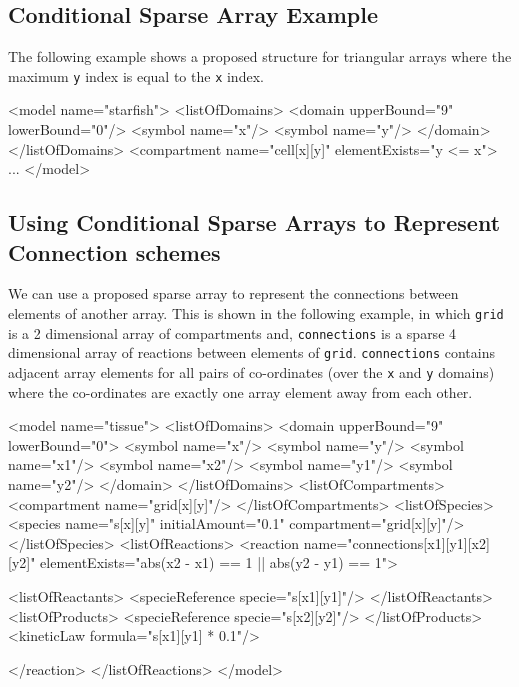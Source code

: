 \documentclass{cekarticle}
\begin{document}
\subsection{Conditional Sparse Array Example}
\label{sec:sparseeg}

The following example shows a proposed structure for triangular
arrays where the maximum \texttt{y} index is equal to the
\texttt{x} index.

\begin{example}
<model name="starfish">
    <listOfDomains>
        <domain upperBound="9" lowerBound="0"/>
            <symbol name="x"/>
            <symbol name="y"/>
        </domain>
    </listOfDomains>
    <compartment name="cell[x][y]" elementExists="y <= x">
    ...
</model>
\end{example}

\subsection{Using Conditional Sparse Arrays to Represent Connection schemes}
\label{sec:connections}

We can use a proposed sparse array to represent the connections
between elements of another array.  This is shown in the
following example, in which \texttt{grid} is a 2 dimensional
array of compartments and, \texttt{connections} is a sparse 4
dimensional array of reactions between elements of \texttt{grid}.
\texttt{connections} contains adjacent array elements for all
pairs of co-ordinates (over the \texttt{x} and \texttt{y}
domains) where the co-ordinates are exactly one array element
away from each other.

\begin{example}
<model name="tissue">
    <listOfDomains>
        <domain upperBound="9" lowerBound="0">
            <symbol name="x"/>
            <symbol name="y"/>
            <symbol name="x1"/>
            <symbol name="x2"/>
            <symbol name="y1"/>
            <symbol name="y2"/>
        </domain>
    </listOfDomains>
    <listOfCompartments>
        <compartment name="grid[x][y]"/>
    </listOfCompartments>
    <listOfSpecies>
        <species name="s[x][y]" initialAmount="0.1" compartment="grid[x][y]"/>
    </listOfSpecies>
    <listOfReactions>
        <reaction
                name="connections[x1][y1][x2][y2]"
                elementExists="abs(x2 - x1) == 1 || abs(y2 - y1) == 1">

            <listOfReactants>
                <specieReference specie="s[x1][y1]"/>
            </listOfReactants>
            <listOfProducts>
                <specieReference specie="s[x2][y2]"/>
            </listOfProducts>
            <kineticLaw formula="s[x1][y1] * 0.1"/>

        </reaction>
    </listOfReactions>
</model>
\end{example}
\end{document}

